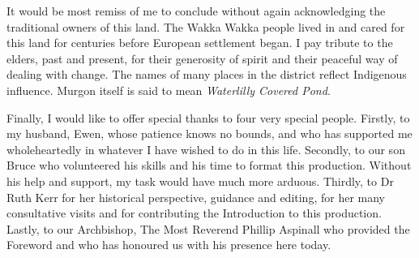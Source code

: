 It would be most remiss of me to conclude without again acknowledging the traditional owners of this land. The Wakka Wakka people lived in and cared for this land for centuries before European settlement began. I pay tribute to the elders, past and present, for their generosity of spirit and their peaceful way of dealing with change. The names of many places in the district reflect Indigenous influence. Murgon itself is said to mean \emph{Waterlilly Covered Pond}.



\balance
Finally, I would like to offer special thanks to four very special people. Firstly, to my husband, Ewen, whose patience knows no bounds, and who has supported me wholeheartedly in whatever I have wished to do in this life. Secondly, to our son Bruce who volunteered his skills and his time to format this production. Without his help and support, my task would have much more arduous. Thirdly, to Dr Ruth Kerr for her historical perspective, guidance and editing, for her many consultative visits and for contributing the Introduction to this production. Lastly, to our Archbishop, The Most Reverend Phillip Aspinall who provided the Foreword and who has honoured us with his presence here today.

